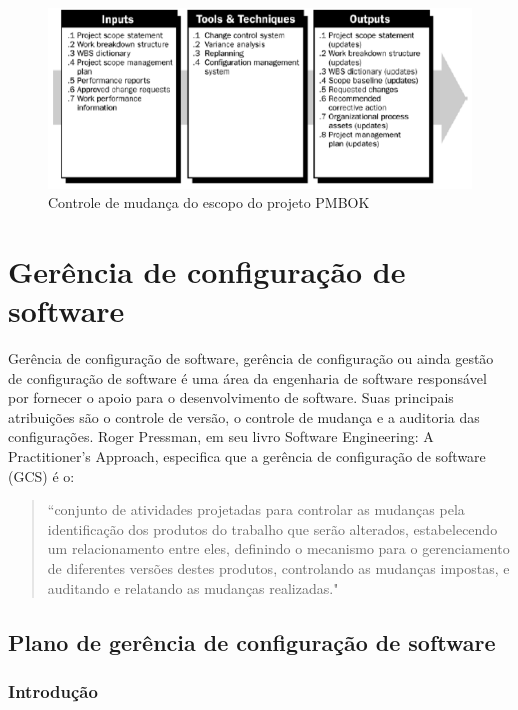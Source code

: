 \begin{figure}[H]
  \centering
  \includegraphics[width=1\textwidth]{softwareengineer/images/pmbok-scope-control} 
  \caption{Controle de mudança do escopo do projeto PMBOK}
  \label{fig:pmbok-scope-control} 
\end{figure}



\section{Gerência de configuração de software}
\label{sec:gerenciaconfig}

Gerência de configuração de software, gerência de configuração ou ainda gestão de configuração de software é uma área da engenharia de software responsável por fornecer o apoio para o desenvolvimento de software. Suas principais atribuições são o controle de versão, o controle de mudança e a auditoria das configurações. Roger Pressman, em seu livro Software Engineering: A Practitioner's Approach, especifica que a gerência de configuração de software (GCS) é o:

\begin{quote}
“conjunto de atividades projetadas para controlar as mudanças pela identificação dos produtos do trabalho que serão alterados, estabelecendo um relacionamento entre eles, definindo o mecanismo para o gerenciamento de diferentes versões destes produtos, controlando as mudanças impostas, e auditando e relatando as mudanças realizadas." \cite{wikiconfig:16}
\end{quote}

\subsection{Plano de gerência de configuração de software}

\subsubsection{Introdução}

